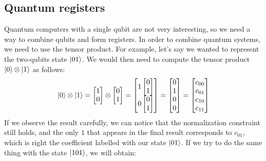 \documentclass[12pt,a4paper]{report}
\theoremstyle{definition}
\theoremstyle{definition}
\theoremstyle{definition}
\begin{document}
\subsection{Quantum registers}
Quantum computers with a single qubit are not very interesting, so we need a way to combine qubits and form registers. In order to combine quantum systems, we need to use the tensor product.
For example, let's say we wanted to represent the two-qubits state $\ket{01}$. We would then need to compute the tensor product $\ket{0}\otimes\ket{1}$ as follows:
\begin{equation*}
    \ket{0}\otimes\ket{1}=\begin{bmatrix}
        1\\
        0
    \end{bmatrix}\otimes\begin{bmatrix}
        0\\
        1
    \end{bmatrix}=\begin{bmatrix}
        1\begin{bmatrix}
            0\\
            1
        \end{bmatrix}\\
        0\begin{bmatrix}
            0\\
            1
        \end{bmatrix}
    \end{bmatrix}=\begin{bmatrix}
            0\\
            1\\
            0\\
            0
    \end{bmatrix}=\begin{bmatrix}
            c_{00}\\
            c_{01}\\
            c_{10}\\
            c_{11}
    \end{bmatrix}
\end{equation*}
If we observe the result carefully, we can notice that the normalization constraint still holds, and the only $1$ that appears in the final result corresponds to $c_{01}$, which is right the coefficient labelled with our state $\ket{01}$. If we try to do the same thing with the state $\ket{101}$, we will obtain:
\end{document}
